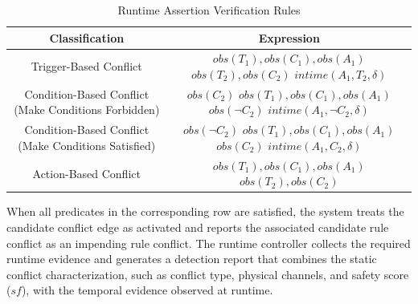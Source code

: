 \begin{table}[htbp]
	\centering
	\small
	\caption{Runtime Assertion Verification Rules}
	\label{Assertion_Verification}
	\begin{adjustbox}{width=1.0\textwidth}
		\begin{tabular}{c|c}
			\hline
			\textbf{Classification} & \textbf{Expression}\\
			\hline
			Trigger-Based Conflict &
			\makecell{
				$obs(T_1), obs(C_1), obs(A_1)$ \\
				$obs(T_2), obs(C_2)$ \\
				$intime(A_1, T_2, \delta)$}\\
			\hline
			Condition-Based Conflict (Make Conditions Forbidden) &
			\makecell{
				$obs(C_2)$ \\
				$obs(T_1), obs(C_1), obs(A_1)$ \\
				$obs(\neg C_2)$ \\
				$intime(A_1, \neg C_2, \delta)$}\\
			\hline
			Condition-Based Conflict (Make Conditions Satisfied) &
			\makecell{
				$obs(\neg C_2)$ \\
				$obs(T_1), obs(C_1), obs(A_1)$ \\
				$obs(C_2)$ \\
				$intime(A_1, C_2, \delta)$}\\
			\hline
			Action-Based Conflict &
			\makecell{
				$obs(T_1), obs(C_1), obs(A_1)$ \\
				$obs(T_2), obs(C_2)$}\\
			\hline
		\end{tabular}
	\end{adjustbox}
\end{table}

When all predicates in the corresponding row are satisfied, the system treats the candidate conflict edge as activated and reports the associated candidate rule conflict as an impending rule conflict. The runtime controller collects the required runtime evidence and generates a detection report that combines the static conflict characterization, such as conflict type, physical channels, and safety score ($sf$), with the temporal evidence observed at runtime.